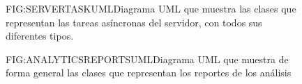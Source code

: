 \begin{figure}[Diagrama UML Tareas Asíncronas]{FIG:SERVERTASKUML}{Diagrama UML que muestra las clases que representan las tareas asíncronas del servidor, con todos sus diferentes tipos.}
\end{figure}
\begin{figure}[Diagrama UML Reportes Análisis]{FIG:ANALYTICSREPORTSUML}{Diagrama UML que muestra de forma general las clases que representan los reportes de los análisis}
\end{figure}
